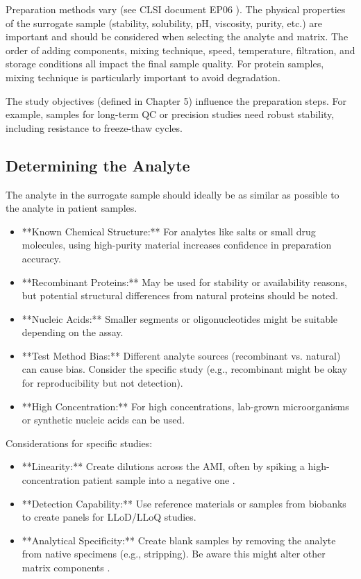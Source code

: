 \documentclass{article}
\begin{document}
Preparation methods vary (see CLSI document EP06 \cite{CLSIEP06}). The physical properties of the surrogate sample (stability, solubility, pH, viscosity, purity, etc.) are important and should be considered when selecting the analyte and matrix. The order of adding components, mixing technique, speed, temperature, filtration, and storage conditions all impact the final sample quality. For protein samples, mixing technique is particularly important to avoid degradation.

The study objectives (defined in Chapter 5) influence the preparation steps. For example, samples for long-term QC or precision studies need robust stability, including resistance to freeze-thaw cycles.

\subsection{Determining the Analyte}

The analyte in the surrogate sample should ideally be as similar as possible to the analyte in patient samples.
\begin{itemize}
    \item **Known Chemical Structure:** For analytes like salts or small drug molecules, using high-purity material increases confidence in preparation accuracy.
    \item **Recombinant Proteins:** May be used for stability or availability reasons, but potential structural differences from natural proteins should be noted.
    \item **Nucleic Acids:** Smaller segments or oligonucleotides might be suitable depending on the assay.
    \item **Test Method Bias:** Different analyte sources (recombinant vs. natural) can cause bias. Consider the specific study (e.g., recombinant might be okay for reproducibility but not detection).
    \item **High Concentration:** For high concentrations, lab-grown microorganisms or synthetic nucleic acids can be used.
\end{itemize}

Considerations for specific studies:
\begin{itemize}
    \item **Linearity:** Create dilutions across the AMI, often by spiking a high-concentration patient sample into a negative one \cite{CLSIEP06}.
    \item **Detection Capability:** Use reference materials or samples from biobanks to create panels for LLoD/LLoQ studies.
    \item **Analytical Specificity:** Create blank samples by removing the analyte from native specimens (e.g., stripping). Be aware this might alter other matrix components \cite{CLSIEP17}.
\end{itemize}
\end{document}

